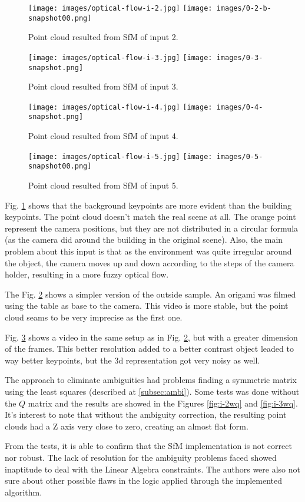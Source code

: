 \documentclass[]{IEEEtran}
\begin{document}
\begin{figure}[H]
    \centering
    \texttt{[image: images/optical-flow-i-2.jpg]}
    \texttt{[image: images/0-2-b-snapshot00.png]}
    \caption{Point cloud resulted from SfM of input 2.}
    \label{fig:i-2}
\end{figure}
\begin{figure}[H]
    \centering
    \texttt{[image: images/optical-flow-i-3.jpg]}
    \texttt{[image: images/0-3-snapshot.png]}
    \caption{Point cloud resulted from SfM of input 3.}
    \label{fig:i-3}
\end{figure}
\begin{figure}[H]
    \centering
    \texttt{[image: images/optical-flow-i-4.jpg]}
    \texttt{[image: images/0-4-snapshot.png]}
    \caption{Point cloud resulted from SfM of input 4.}
    \label{fig:i-4-2}
\end{figure}
\begin{figure}[H]
    \centering
    \texttt{[image: images/optical-flow-i-5.jpg]}
    \texttt{[image: images/0-5-snapshot00.png]}
    \caption{Point cloud resulted from SfM of input 5.}
    \label{fig:i-5}
\end{figure}

Fig. \ref{fig:i-2} shows that the background keypoints are more evident than the building keypoints. The point cloud doesn't match the real scene at all. The orange point represent the camera positions, but they are not distributed in a circular formula (as the camera did around the building in the original scene). Also, the main problem about this input is that as the environment was quite irregular around the object, the camera moves up and down according to the steps of the camera holder, resulting in a more fuzzy optical flow. 

The Fig. \ref{fig:i-3} shows a simpler version of the outside sample. An origami was filmed using the table as base to the camera. This video is more stable, but the point cloud seams to be very imprecise as the first one.

Fig. \ref{fig:i-4-2} shows a video in the same setup as in Fig. \ref{fig:i-3}, but with a greater dimension of the frames. This better resolution added to a better contrast object leaded to way better keypoints, but the 3d representation got very noisy as well.

The approach to eliminate ambiguities had problems finding a symmetric matrix using the least squares (described at \ref{subsec:ambi}). Some tests was done without the $Q$ matrix and the results are showed in the Figures \ref{fig:i-2wq} and \ref{fig:i-3wq}. It's interest to note that without the ambiguity correction, the resulting point clouds had a Z axis very close to zero, creating an almost flat form.
\par From the tests, it is able to confirm that the SfM implementation is not correct nor robust. The lack of resolution for the ambiguity problems faced showed inaptitude to deal with the Linear Algebra constraints. The authors were also not sure about other possible flaws in the logic applied through the implemented algorithm.
\end{document}
